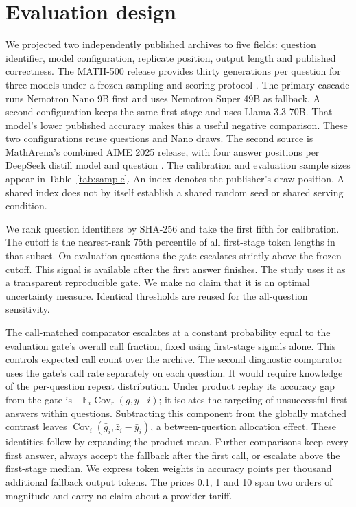 \documentclass[11pt]{article}
\newcommand{\E}{\mathbb E}
\newcommand{\Cov}{\operatorname{Cov}}
\begin{document}


\section{Evaluation design}
We projected two independently published archives to five fields: question identifier, model configuration, replicate position, output length and published correctness. The MATH-500 release provides thirty generations per question for three models under a frozen sampling and scoring protocol \cite{chen2,data1}. The primary cascade runs Nemotron Nano 9B first and uses Nemotron Super 49B as fallback. A second configuration keeps the same first stage and uses Llama 3.3 70B. That model's lower published accuracy makes this a useful negative comparison. These two configurations reuse questions and Nano draws. The second source is MathArena's combined AIME 2025 release, with four answer positions per DeepSeek distill model and question \cite{matharena,data2}. The calibration and evaluation sample sizes appear in Table~\ref{tab:sample}. An index denotes the publisher's draw position. A shared index does not by itself establish a shared random seed or shared serving condition.

We rank question identifiers by SHA-256 and take the first fifth for calibration. The cutoff is the nearest-rank 75th percentile of all first-stage token lengths in that subset. On evaluation questions the gate escalates strictly above the frozen cutoff. This signal is available after the first answer finishes. The study uses it as a transparent reproducible gate. We make no claim that it is an optimal uncertainty measure. Identical thresholds are reused for the all-question sensitivity.

The call-matched comparator escalates at a constant probability equal to the evaluation gate's overall call fraction, fixed using first-stage signals alone. This controls expected call count over the archive. The second diagnostic comparator uses the gate's call rate separately on each question. It would require knowledge of the per-question repeat distribution. Under product replay its accuracy gap from the gate is $-\E_i\Cov_r(g,y\mid i)$; it isolates the targeting of unsuccessful first answers within questions. Subtracting this component from the globally matched contrast leaves $\Cov_i(\bar g_i,\bar z_i-\bar y_i)$, a between-question allocation effect. These identities follow by expanding the product mean. Further comparisons keep every first answer, always accept the fallback after the first call, or escalate above the first-stage median. We express token weights in accuracy points per thousand additional fallback output tokens. The prices 0.1, 1 and 10 span two orders of magnitude and carry no claim about a provider tariff.
\end{document}
